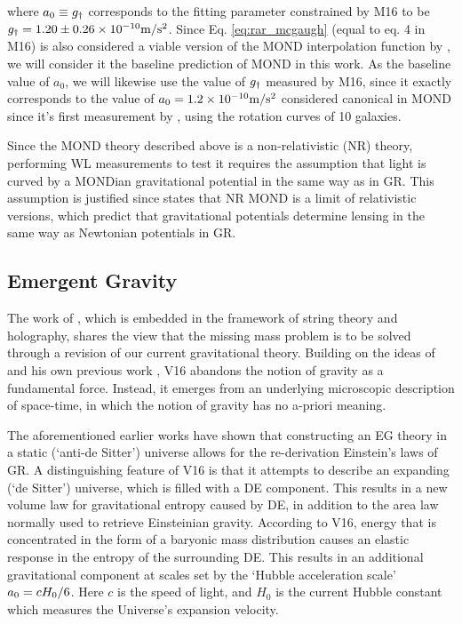 \documentclass[usenatbib]{mnras}
\newcommand{\mpss}{ {\rm m/s^2} }
\newcommand*{\E}[1]{\times 10^{#1}}
\newcommand{\un}[1]{_{\rm #1}}
\begin{document}
where $a_0 \equiv g\un{\dagger}$ corresponds to the fitting parameter constrained by M16 to be $g\un{\dagger}=1.20\pm0.26\E{-10} \mpss$. Since Eq. \ref{eq:rar_mcgaugh} (equal to eq. 4 in M16) is also considered a viable version of the MOND interpolation function by \cite{milgrom2008}, we will consider it the baseline prediction of MOND in this work. As the baseline value of $a_0$, we will likewise use the value of $g\un{\dagger}$ measured by M16, since it exactly corresponds to the value of $a_0=1.2\E{-10} \mpss$ considered canonical in MOND since it's first measurement by \cite{begeman1991}, using the rotation curves of 10 galaxies.

Since the MOND theory described above is a non-relativistic (NR) theory, performing WL measurements to test it requires the assumption that light is curved by a MONDian gravitational potential in the same way as in GR. This assumption is justified since \citet[][while testing the MOND paradigm using GGL data from the Canada-France-Hawaii Telescope survey]{milgrom2013} states that NR MOND is a limit of relativistic versions, which predict that gravitational potentials determine lensing in the same way as Newtonian potentials in GR.

\subsection{Emergent Gravity}
\label{sec:EG}

The work of \citet[][V16 hereafter]{verlinde2016}, which is embedded in the framework of string theory and holography, shares the view that the missing mass problem is to be solved through a revision of our current gravitational theory. Building on the ideas of \cite{jacobson1995,jacobson2016,padmanabhan2010,faulkner2015} and his own previous work \cite[]{verlinde2011}, V16 abandons the notion of gravity as a fundamental force. Instead, it emerges from an underlying microscopic description of space-time, in which the notion of gravity has no a-priori meaning.

The aforementioned earlier works have shown that constructing an EG theory in a static (`anti-de Sitter') universe allows for the re-derivation Einstein's laws of GR. A distinguishing feature of V16 is that it attempts to describe an expanding (`de Sitter') universe, which is filled with a DE component. This results in a new volume law for gravitational entropy caused by DE, in addition to the area law normally used to retrieve Einsteinian gravity. According to V16, energy that is concentrated in the form of a baryonic mass distribution causes an elastic response in the entropy of the surrounding DE. This results in an additional gravitational component at scales set by the `Hubble acceleration scale' $a\un{0} = c H_0/6$. Here $c$ is the speed of light, and $H_0$ is the current Hubble constant which measures the Universe's expansion velocity.
\end{document}
